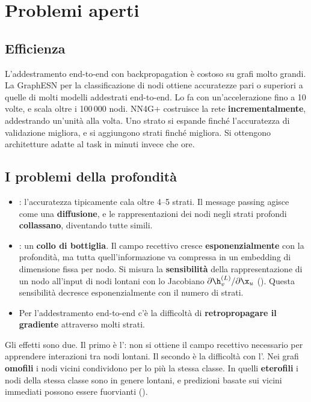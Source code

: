 \section{Problemi aperti}

\subsection{Efficienza}

L'addestramento end-to-end con backpropagation è costoso su grafi molto grandi. La GraphESN per la classificazione
di nodi ottiene accuratezze pari o superiori a quelle di molti modelli addestrati end-to-end. Lo fa con
un'accelerazione fino a 10 volte, e scala oltre i 100\,000 nodi. NN4G+ costruisce la rete
\textbf{incrementalmente}, addestrando un'unità alla volta. Uno strato si espande finché l'accuratezza di
validazione migliora, e si aggiungono strati finché migliora. Si ottengono architetture adatte al task in minuti
invece che ore.

\subsection{I problemi della profondità}

\begin{itemize}
  \item {}: l'accuratezza tipicamente cala oltre 4--5 strati. Il message passing agisce come
        una \textbf{diffusione}, e le rappresentazioni dei nodi negli strati profondi \textbf{collassano},
        diventando tutte simili.
  \item {}: un \textbf{collo di bottiglia}. Il campo recettivo cresce
        \textbf{esponenzialmente} con la profondità, ma tutta quell'informazione va compressa in un embedding di
        dimensione fissa per nodo. Si misura la \textbf{sensibilità} della rappresentazione di un nodo all'input di
        nodi lontani con lo Jacobiano $\partial\h_v^{(L)}/\partial\x_u$ (). Questa
        sensibilità decresce esponenzialmente con il numero di strati.
  \item Per l'addestramento end-to-end c'è la difficoltà di \textbf{retropropagare il gradiente} attraverso molti
        strati.
\end{itemize}
Gli effetti sono due. Il primo è l': non si ottiene il campo recettivo necessario per
apprendere interazioni tra nodi lontani. Il secondo è la difficoltà con l'. Nei grafi
\textbf{omofili} i nodi vicini condividono per lo più la stessa classe. In quelli \textbf{eterofili} i nodi della
stessa classe sono in genere lontani, e predizioni basate sui vicini immediati possono essere fuorvianti
().

